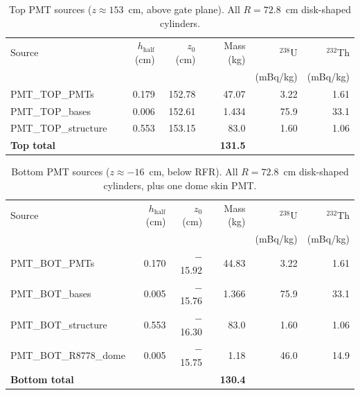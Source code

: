 \documentclass[11pt]{article}
\begin{document}
\begin{table}[h]
\centering
\caption{Top PMT sources ($z \approx 153$~cm, above gate plane).
  All $R = 72.8$~cm disk-shaped cylinders.}
\label{tab:pmt_top}
\small
\begin{tabular}{@{}lrrrrr@{}}
\toprule
{Source} & {$h_\text{half}$ (cm)} & {$z_0$ (cm)} & {Mass (kg)} &
  {$^{238}$U} & {$^{232}$Th} \\
 & & & & {(mBq/kg)} & {(mBq/kg)} \\
\midrule
PMT\_TOP\_PMTs       & 0.179 & 152.78 & 47.07  & 3.22 & 1.61 \\
PMT\_TOP\_bases      & 0.006 & 152.61 &  1.434 & 75.9 & 33.1 \\
PMT\_TOP\_structure  & 0.553 & 153.15 & 83.0   & 1.60 & 1.06 \\
\midrule
\textbf{Top total}   &       &        & \textbf{131.5} & & \\
\bottomrule
\end{tabular}
\end{table}

\begin{table}[h]
\centering
\caption{Bottom PMT sources ($z \approx -16$~cm, below RFR).
  All $R = 72.8$~cm disk-shaped cylinders, plus one dome skin PMT.}
\label{tab:pmt_bottom}
\small
\begin{tabular}{@{}lrrrrr@{}}
\toprule
{Source} & {$h_\text{half}$ (cm)} & {$z_0$ (cm)} & {Mass (kg)} &
  {$^{238}$U} & {$^{232}$Th} \\
 & & & & {(mBq/kg)} & {(mBq/kg)} \\
\midrule
PMT\_BOT\_PMTs          & 0.170 & $-$15.92 & 44.83  & 3.22 & 1.61 \\
PMT\_BOT\_bases         & 0.005 & $-$15.76 &  1.366 & 75.9 & 33.1 \\
PMT\_BOT\_structure     & 0.553 & $-$16.30 & 83.0   & 1.60 & 1.06 \\
PMT\_BOT\_R8778\_dome   & 0.005 & $-$15.75 &  1.18  & 46.0 & 14.9 \\
\midrule
\textbf{Bottom total}   &       &          & \textbf{130.4} & & \\
\bottomrule
\end{tabular}
\end{table}
\end{document}
